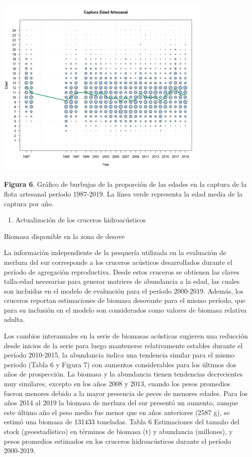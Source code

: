 \documentclass[
  spanish,
]{article}
\providecommand{\tightlist}{%
  \setlength{\itemsep}{0pt}\setlength{\parskip}{0pt}}
\begin{document}
\begin{center}
\includegraphics[width=0.8\textwidth]{Figuras/Figura_6.png}
\end{center}

\small \textbf{Figura 6}. Gráfico de burbujas de la proporción de las
edades en la captura de la flota artesanal período 1987-2019. La línea
verde representa la edad media de la captura por año. \vspace{0.5cm}
\normalsize

\begin{enumerate}
\def\labelenumi{\alph{enumi})}
\setcounter{enumi}{2}
\tightlist
\item
  Actualización de los cruceros hidroacústicos
\end{enumerate}

Biomasa disponible en la zona de desove

La información independiente de la pesquería utilizada en la evaluación
de merluza del sur corresponde a los cruceros acústicos desarrollados
durante el período de agregación reproductiva. Desde estos cruceros se
obtienen las claves talla-edad necesarias para generar matrices de
abundancia a la edad, las cuales son incluidas en el modelo de
evaluación para el período 2000-2019. Además, los cruceros reportan
estimaciones de biomasa desovante para el mismo período, que para su
inclusión en el modelo son considerados como valores de biomasa relativa
adulta.

Los cambios interanuales en la serie de biomasas acústicas sugieren una
reducción desde inicios de la serie para luego mantenerse relativamente
estables durante el período 2010-2015, la abundancia indica una
tendencia similar para el mismo periodo (Tabla 6 y Figura 7) con
aumentos considerables para los últimos dos años de prospección. La
biomasa y la abundancia tienen tendencias decrecientes muy similares,
excepto en los años 2008 y 2013, cuando los pesos promedios fueron
menores debido a la mayor presencia de peces de menores edades. Para los
años 2014 al 2019 la biomasa de merluza del sur presentó un aumento,
aunque este último año el peso medio fue menor que en años anteriores
(2587 g), se estimó una biomasa de 131433 toneladas. Tabla 6
Estimaciones del tamaño del stock (geoestadístico) en términos de
biomasa (t) y abundancia (millones), y pesos promedios estimados en los
cruceros hidroacústicos durante el período 2000-2019.
\end{document}
